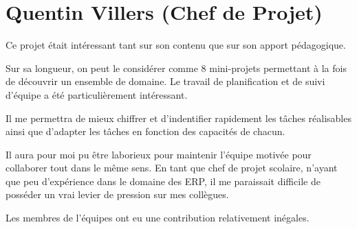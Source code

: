 \section{Quentin Villers (Chef de Projet)}

Ce projet était intéressant tant sur son contenu que sur son apport pédagogique. 

Sur sa longueur, on peut le considérer comme 8 mini-projets permettant à la fois de découvrir 
un ensemble de domaine. Le travail de planification et de suivi d'équipe a été particulièrement intéressant.

Il me permettra de mieux chiffrer et d'indentifier rapidement les tâches réalisables ainsi 
que d'adapter les tâches en fonction des capacités de chacun. 

Il aura pour moi pu être laborieux pour maintenir l'équipe motivée pour collaborer 
tout dans le même sens. En tant que chef de projet scolaire, n'ayant que peu d'expérience
dans le domaine des ERP, il me paraissait difficile de posséder un vrai levier de pression 
sur mes collègues.

Les membres de l'équipes ont eu une contribution relativement inégales.
